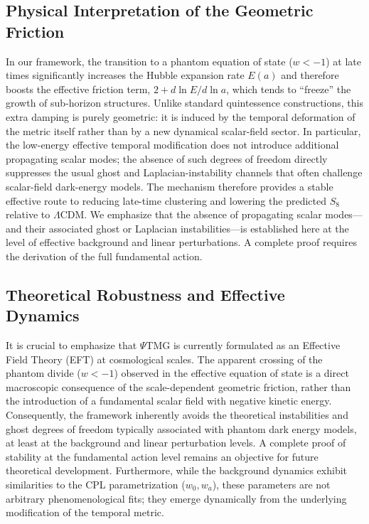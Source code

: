 \documentclass[10pt,twocolumn,secnumarabic,amssymb, nobibnotes, aps, prd, floatfix]{revtex4-2}
\begin{document}
\subsection*{Physical Interpretation of the Geometric Friction}

In our framework, the transition to a phantom equation of state ($w < -1$) at late times significantly increases the Hubble expansion rate $E(a)$ and therefore boosts the effective friction term, $2 + d \ln E / d \ln a$, which tends to ``freeze'' the growth of sub-horizon structures. Unlike standard quintessence constructions, this extra damping is purely geometric: it is induced by the temporal deformation of the metric itself rather than by a new dynamical scalar-field sector. In particular, the low-energy effective temporal modification does not introduce additional propagating scalar modes; the absence of such degrees of freedom directly suppresses the usual ghost and Laplacian-instability channels that often challenge scalar-field dark-energy models. The mechanism therefore provides a stable effective route to reducing late-time clustering and lowering the predicted $S_8$ relative to $\Lambda$CDM.
We emphasize that the absence of propagating scalar modes---and their associated ghost or Laplacian instabilities---is established here at the level of effective background and linear perturbations. A complete proof requires the derivation of the full fundamental action.

\subsection*{Theoretical Robustness and Effective Dynamics}

It is crucial to emphasize that $\Psi$TMG is currently formulated as an Effective Field Theory (EFT) at cosmological scales. The apparent crossing of the phantom divide ($w < -1$) observed in the effective equation of state is a direct macroscopic consequence of the scale-dependent geometric friction, rather than the introduction of a fundamental scalar field with negative kinetic energy. Consequently, the framework inherently avoids the theoretical instabilities and ghost degrees of freedom typically associated with phantom dark energy models, at least at the background and linear perturbation levels. A complete proof of stability at the fundamental action level remains an objective for future theoretical development. Furthermore, while the background dynamics exhibit similarities to the CPL parametrization ($w_0, w_a$), these parameters are not arbitrary phenomenological fits; they emerge dynamically from the underlying modification of the temporal metric.
\end{document}
